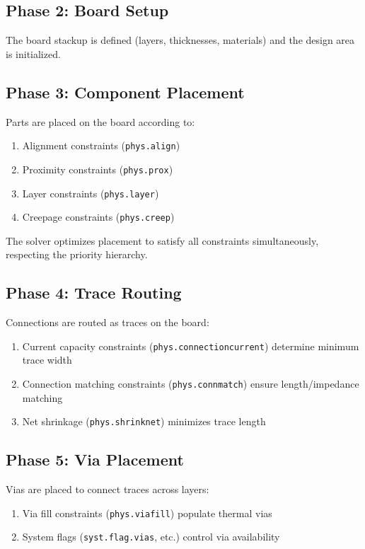 \subsection{Phase 2: Board Setup}
The board stackup is defined (layers, thicknesses, materials) and the design area is initialized.

\subsection{Phase 3: Component Placement}
Parts are placed on the board according to:
\begin{enumerate}
\item Alignment constraints (\texttt{phys.align})
\item Proximity constraints (\texttt{phys.prox})
\item Layer constraints (\texttt{phys.layer})
\item Creepage constraints (\texttt{phys.creep})
\end{enumerate}

The solver optimizes placement to satisfy all constraints simultaneously, respecting the priority hierarchy.

\subsection{Phase 4: Trace Routing}
Connections are routed as traces on the board:
\begin{enumerate}
\item Current capacity constraints (\texttt{phys.connectioncurrent}) determine minimum trace width
\item Connection matching constraints (\texttt{phys.connmatch}) ensure length/impedance matching
\item Net shrinkage (\texttt{phys.shrinknet}) minimizes trace length
\end{enumerate}

\subsection{Phase 5: Via Placement}
Vias are placed to connect traces across layers:
\begin{enumerate}
\item Via fill constraints (\texttt{phys.viafill}) populate thermal vias
\item System flags (\texttt{syst.flag.vias}, etc.) control via availability
\end{enumerate}

